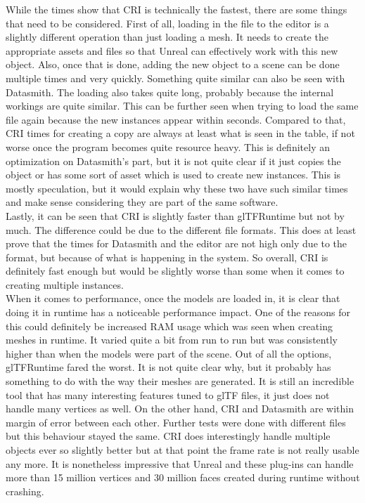 While the times show that \acs{CRI} is technically the fastest, there are some things that need to be considered. First of all, loading in the file to the editor is a slightly different operation than just loading a mesh. It needs to create the appropriate assets and files so that Unreal can effectively work with this new object. Also, once that is done, adding the new object to a scene can be done multiple times and very quickly. Something quite similar can also be seen with Datasmith. The loading also takes quite long, probably because the internal workings are quite similar. This can be further seen when trying to load the same file again because the new instances appear within seconds. Compared to that, CRI times for creating a copy are always at least what is seen in the table, if not worse once the program becomes quite resource heavy. This is definitely an optimization on Datasmith's part, but it is not quite clear if it just copies the object or has some sort of asset which is used to create new instances. This is mostly speculation, but it would explain why these two have such similar times and make sense considering they are part of the same software.\\
Lastly, it can be seen that \acs{CRI} is slightly faster than glTFRuntime but not by much. The difference could be due to the different file formats. This does at least prove that the times for Datasmith and the editor are not high only due to the format, but because of what is happening in the system. So overall, \acs{CRI} is definitely fast enough but would be slightly worse than some when it comes to creating multiple instances.\\

When it comes to performance, once the models are loaded in, it is clear that doing it in runtime has a noticeable performance impact. One of the reasons for this could definitely be increased RAM usage which was seen when creating meshes in runtime. It varied quite a bit from run to run but was consistently higher than when the models were part of the scene. Out of all the options, glTFRuntime fared the worst. It is not quite clear why, but it probably has something to do with the way their meshes are generated. It is still an incredible tool that has many interesting features tuned to glTF files, it just does not handle many vertices as well. On the other hand, CRI and Datasmith are within margin of error between each other. Further tests were done with different files but this behaviour stayed the same. CRI does interestingly handle multiple objects ever so slightly better but at that point the frame rate is not really usable any more. It is nonetheless impressive that Unreal and these plug-ins can handle more than 15 million vertices and 30 million faces created during runtime without crashing. 


